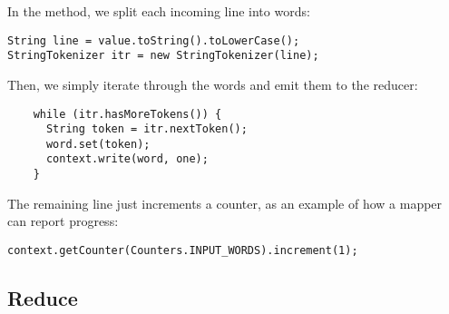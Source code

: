 \documentclass[a4paper,11pt]{article}
\begin{document}
  
  In the method, we split each incoming line into words:
  \begin{lstlisting}
String line = value.toString().toLowerCase();
StringTokenizer itr = new StringTokenizer(line);
  \end{lstlisting}
  
  Then, we simply iterate through the words and emit them to the reducer: 
  \begin{lstlisting}
    while (itr.hasMoreTokens()) {
      String token = itr.nextToken();
      word.set(token);
      context.write(word, one);
    }
  \end{lstlisting}
  
  The remaining line just increments a counter, as an example of how a mapper can report progress:
  
  \begin{lstlisting}
context.getCounter(Counters.INPUT_WORDS).increment(1);
\end{lstlisting}


% 

\subsection{Reduce}


\end{document}
